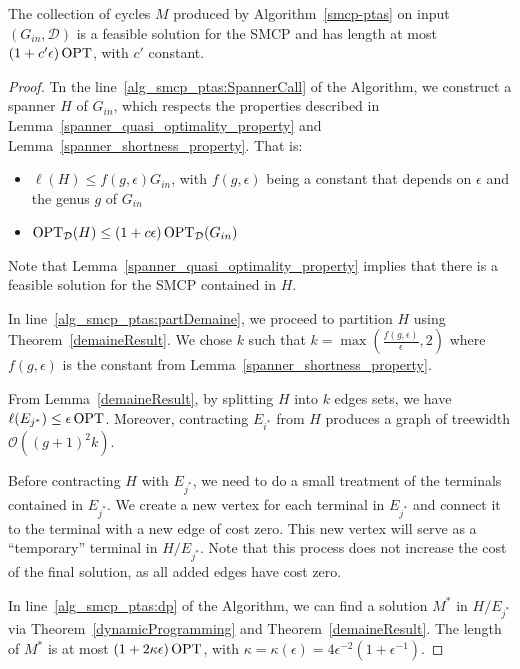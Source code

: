 \begin{theorem}
    The collection of cycles \(M\) produced by Algorithm~\ref{smcp-ptas} on input $(G_{in}, \mathcal{D})$ is a feasible solution for the SMCP and has length at most \((1 + c' \epsilon) \operatorname{\textrm{OPT}}\), with \(c'\) constant.
\end{theorem}
\begin{proof}

    Tn the line~\ref{alg_smcp_ptas:SpannerCall} of the Algorithm, we construct a spanner \(H\) of \(G_{in}\), which respects the properties described in Lemma~\ref{spanner_quasi_optimality_property} and Lemma~\ref{spanner_shortness_property}. That is:

    \begin{itemize}
        \item \(\ell(H) \leq f(g, \epsilon) G_{in}\), with \(f(g, \epsilon)\) being a constant that depends on \(\epsilon\) and the genus \(g\) of \(G_{in}\)
        \item \(\operatorname{\textrm{OPT}}_{\mathcal{D}}(H) \leq (1 + c \epsilon) \operatorname{\textrm{OPT}}_{\mathcal{D}} (G_{in})\)
    \end{itemize}

    Note that Lemma~\ref{spanner_quasi_optimality_property} implies that there is a feasible solution for the SMCP contained in \(H\).

    In line~\ref{alg_smcp_ptas:partDemaine}, we proceed to partition \(H\) using Theorem~\ref{demaineResult}. We chose \(k\) such that \(k = \max( \frac{f(g, \epsilon)}{\epsilon}, 2)\) where \(f(g, \epsilon)\) is the constant from Lemma~\ref{spanner_shortness_property}. 
    
    From Lemma~\ref{demaineResult}, by splitting \(H\) into \(k\) edges sets, we have \(\ell(E_{j^\ast}) \leq \epsilon \operatorname{\textrm{OPT}}\). Moreover, contracting \(E_{i^\ast}\) from \(H\) produces a graph of treewidth \(\mathcal{O}((g +1)^2 k)\).

    Before contracting \(H\) with \(E_{j^\ast}\), we need to do a small treatment of the terminals contained in \(E_{j^\ast}\). We create a new vertex for each terminal in \(E_{j^\ast}\) and connect it to the terminal with a new edge of cost zero. This new vertex will serve as a ``temporary'' terminal in \(H / E_{j^\ast}\). Note that this process does not increase the cost of the final solution, as all added edges have cost zero.
    
    In line~\ref{alg_smcp_ptas:dp} of the Algorithm, we can find a solution \(M^\ast\) in \(H / E_{j^\ast}\) via Theorem~\ref{dynamicProgramming} and Theorem~\ref{demaineResult}. The length of \(M^\ast\) is at most \((1 + 2 \kappa \epsilon) \operatorname{\textrm{OPT}}\), with \(\kappa = \kappa(\epsilon) = 4 \epsilon ^ {-2} (1 + \epsilon ^ {-1})\).


\end{proof}
